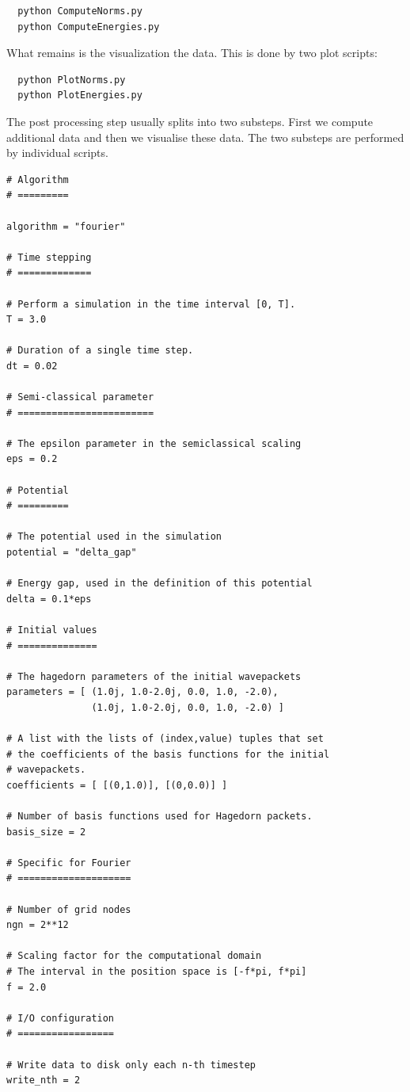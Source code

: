 \documentclass[a4paper,10pt]{report}
\begin{document}
\begin{verbatim}
  python ComputeNorms.py
  python ComputeEnergies.py
\end{verbatim}

What remains is the visualization the data. This is done by two plot scripts:

\begin{verbatim}
  python PlotNorms.py
  python PlotEnergies.py
\end{verbatim}

The post processing step usually splits into two substeps. First we compute additional
data and then we visualise these data. The two substeps are performed by individual
scripts.

% 
\begin{lstlisting}[float=tp,frame=single,label=lstparameters01,caption={Sample configuration \texttt{parameters\_01.py}}]
# Algorithm
# =========

algorithm = "fourier"

# Time stepping
# =============

# Perform a simulation in the time interval [0, T].
T = 3.0

# Duration of a single time step.
dt = 0.02

# Semi-classical parameter
# ========================

# The epsilon parameter in the semiclassical scaling
eps = 0.2

# Potential
# =========

# The potential used in the simulation
potential = "delta_gap"

# Energy gap, used in the definition of this potential
delta = 0.1*eps

# Initial values
# ==============

# The hagedorn parameters of the initial wavepackets
parameters = [ (1.0j, 1.0-2.0j, 0.0, 1.0, -2.0),
               (1.0j, 1.0-2.0j, 0.0, 1.0, -2.0) ]

# A list with the lists of (index,value) tuples that set
# the coefficients of the basis functions for the initial
# wavepackets.
coefficients = [ [(0,1.0)], [(0,0.0)] ]

# Number of basis functions used for Hagedorn packets.
basis_size = 2

# Specific for Fourier
# ====================

# Number of grid nodes
ngn = 2**12

# Scaling factor for the computational domain
# The interval in the position space is [-f*pi, f*pi]
f = 2.0

# I/O configuration
# =================

# Write data to disk only each n-th timestep
write_nth = 2
\end{lstlisting}
\end{document}
